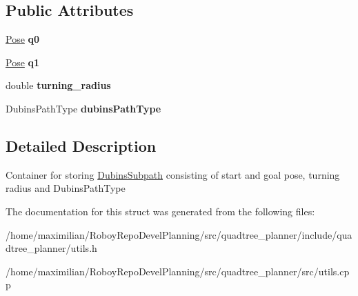 \subsection*{Public Attributes}
\begin{DoxyCompactItemize}
\item 
\mbox{\label{structquadtree__planner_1_1DubinsSubpath_a855b4da40a33f3f00972d27cffd46676}} 
\hyperlink{structquadtree__planner_1_1Pose}{Pose} {\bfseries q0}
\item 
\mbox{\label{structquadtree__planner_1_1DubinsSubpath_a21654f1004522b7dbacca9459ccf3b23}} 
\hyperlink{structquadtree__planner_1_1Pose}{Pose} {\bfseries q1}
\item 
\mbox{\label{structquadtree__planner_1_1DubinsSubpath_a1287c19670d9d00eedfb8a8086a06754}} 
double {\bfseries turning\+\_\+radius}
\item 
\mbox{\label{structquadtree__planner_1_1DubinsSubpath_ae7ea561e580756e838676b3c4f39566c}} 
Dubins\+Path\+Type {\bfseries dubins\+Path\+Type}
\end{DoxyCompactItemize}


\subsection{Detailed Description}
Container for storing \hyperlink{structquadtree__planner_1_1DubinsSubpath}{Dubins\+Subpath} consisting of start and goal pose, turning radius and Dubins\+Path\+Type 

The documentation for this struct was generated from the following files\+:\begin{DoxyCompactItemize}
\item 
/home/maximilian/\+Roboy\+Repo\+Devel\+Planning/src/quadtree\+\_\+planner/include/quadtree\+\_\+planner/utils.\+h\item 
/home/maximilian/\+Roboy\+Repo\+Devel\+Planning/src/quadtree\+\_\+planner/src/utils.\+cpp\end{DoxyCompactItemize}
